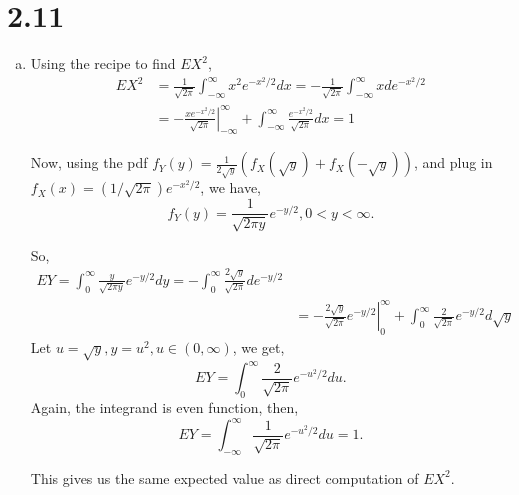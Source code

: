 \documentclass[letter]{article}
\newcommand{\intii}{\int_{-\infty}^\infty}
\newcommand{\intzi}{\int_0^\infty}
\begin{document}
    \section*{2.11}
    \begin{enumerate}[(a)]
    \item Using the recipe to find $EX^2$,
    \begin{align*}
    EX^2 & = \frac{1}{\sqrt{2\pi}} \intii x^2 e^{-x^2/2} dx
    = -\frac{1}{\sqrt{2\pi}} \intii x d e^{-x^2/2} \\
    & = \left.-\frac{x e^{-x^2/2}}{\sqrt{2\pi}}\right|^\infty_{-\infty} + \intii \frac{e^{-x^2/2}}{\sqrt{2\pi}} dx = 1
    \end{align*}

    Now, using the pdf 
    $f_Y(y) = \frac{1}{2\sqrt{y}}\left(f_X(\sqrt{y}) + f_X(-\sqrt{y})\right)$, and plug in $f_X(x) = (1/\sqrt{2\pi})e^{-x^2/2}$, we have,
    \[
    f_Y(y) = \frac{1}{\sqrt{2\pi y}}e^{-y/2}, 0 < y < \infty.
    \]

    So,
    \begin{align*}
    EY = \intzi \frac{y}{\sqrt{2\pi y}} e^{-y/2} dy = 
    - \intzi \frac{2\sqrt{y}}{\sqrt{2\pi}} d e^{-y/2} \\
    & = - \left. \frac{2\sqrt{y}}{\sqrt{2\pi}} e^{-y/2} \right|_0^\infty
    + \intzi \frac{2}{\sqrt{2\pi}} e^{-y/2} d\sqrt{y}
    \end{align*}
    Let $u = \sqrt{y}, y = u^2, u \in (0, \infty)$, we get,
    \[
    EY = \intzi \frac{2}{\sqrt{2\pi}} e^{-u^2/2} du.
    \]
    Again, the integrand is even function, then,
    \[
    EY = \intii \frac{1}{\sqrt{2\pi}} e^{-u^2/2} du = 1.
    \]

    This gives us the same expected value as direct computation of $EX^2$.


\end{enumerate}
\end{document}
